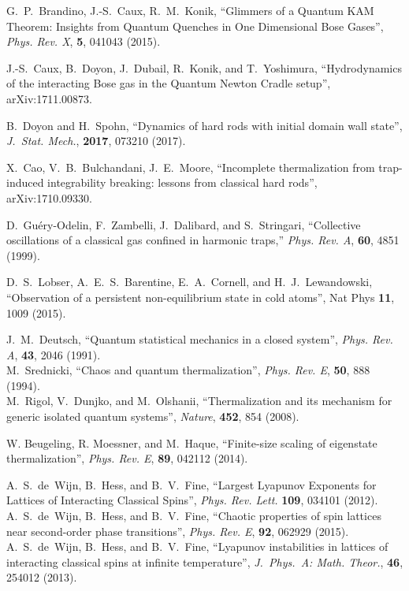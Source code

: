 \documentclass[a4paper, onecolumn]{revtex4-1}
\begin{document}
\begin{thebibliography}{1}
G.~P.~Brandino, J.-S.~Caux, R.~M.~Konik,
``Glimmers of a Quantum KAM Theorem: Insights from Quantum Quenches in One Dimensional Bose Gases'', 
{\em Phys. Rev. X}, {\bf 5}, 041043 (2015).  

 J.-S.~Caux, B.~Doyon, J.~Dubail, R.~Konik, and T.~Yoshimura,
  ``Hydrodynamics of the interacting Bose gas in the Quantum Newton Cradle setup'',
  arXiv:1711.00873.

 B.~Doyon and H.~Spohn, ``Dynamics of hard rods with initial domain wall
  state'', {\em J.~Stat. Mech.}, {\bf 2017}, 073210 (2017).

 X.~Cao, V.~B.~Bulchandani, J.~E.~Moore, ``Incomplete thermalization from
  trap-induced integrability breaking: lessons from classical hard rods'', arXiv:1710.09330.


  
D.~Gu\'ery-Odelin, F.~Zambelli, J.~Dalibard, and S.~Stringari, ``Collective
  oscillations of a classical gas confined in harmonic traps,'' {\em Phys. Rev.
  A}, {\bf 60}, 4851 (1999).

 D.~S.~Lobser, A.~E.~S.~Barentine, E.~A.~Cornell, and
  H.~J.~Lewandowski, ``Observation of a persistent non-equilibrium state in cold atoms'', Nat Phys
  {\bf 11}, 1009 (2015).




J.~M.~Deutsch, ``Quantum statistical mechanics in a closed system'', {\em Phys. Rev. A}, {\bf 43}, 2046 (1991).
%
\\
%
M.~Srednicki, ``Chaos and quantum thermalization'', {\em Phys. Rev. E}, {\bf 50}, 888 (1994).
%
\\
%
M.~Rigol, V.~Dunjko, and M.~Olshanii, ``Thermalization and its mechanism for generic isolated
quantum systems'', {\em Nature}, {\bf 452}, 854 (2008).


W. Beugeling, R. Moessner, and M.~Haque, 
``Finite-size scaling of eigenstate thermalization'', 
{\em Phys. Rev. E}, {\bf 89}, 042112 (2014). 



A.~S.~de~Wijn, B.~Hess, and B.~V.~Fine, 
``Largest Lyapunov Exponents for Lattices of Interacting Classical Spins'', 
{\em Phys. Rev. Lett.} {\bf 109}, 034101 (2012). 
%
\\
%
A.~S.~de~Wijn, B.~Hess, and B.~V.~Fine, 
``Chaotic properties of spin lattices near second-order phase transitions'',
{\em Phys. Rev. E}, {\bf 92}, 062929 (2015). 
%
\\
%
A.~S.~de~Wijn, B.~Hess, and B.~V.~Fine, 
``Lyapunov instabilities in lattices of interacting classical spins at infinite temperature'', 
{\em J.~Phys.~A: Math. Theor.}, {\bf 46}, 254012 (2013). 



\end{thebibliography}
\end{document}
